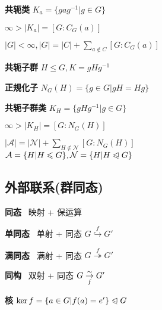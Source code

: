 \documentclass[b4paper, 10pt]{ctexart}
\renewcommand*{\leq}{\leqslant}
\newcommand*{\nmsubgroupeq}{\trianglelefteqslant}
\begin{document}
\begin{multicols}{3}
    \textbf{共轭类} $K_a = \{ gag^{-1} | g \in G \}$

    \begin{theorem}[共轭子群基数定理]
        $\infty > |K_a| = [G:C_G(a)]$
    \end{theorem}

    \begin{theorem}[类方程]
        $|G| \! < \! \infty, |G| \! = \! |C| + \sum\limits_{a \notin C} [G:C_G(a)]$
    \end{theorem}

    \textbf{共轭子群} $H \leq G, K = gHg^{-1}$

    \textbf{正规化子} $N_G(H) = \{g \in G | gH = Hg\}$

    \textbf{共轭子群类} $K_H = \{gHg^{-1} | g \in G\}$

    \begin{theorem}[共轭子群类基数定理]
        $\infty > |K_H| \!\! = \!\! [G:N_G(H)]$
    \end{theorem}

    \begin{theorem}[类方程2]
        $|\mathcal{A}| = |\mathcal{N}| + \sum\limits_{H \notin \mathcal{N}} [G:N_G(H)]$ \\
        $\mathcal{A} = \{ H | H \leq G \}, \mathcal{N} = \{ H | H \nmsubgroupeq G \}$
    \end{theorem}

    \subsection{外部联系(群同态)} \label{sec:group-homomorphism}

    \textbf{同态} \ 映射 + 保运算

    \textbf{单同态} \ 单射 + 同态 $G \overset{f}{\hookrightarrow} G'$

    \textbf{满同态} \ 满射 + 同态 $G \overset{f}{\twoheadrightarrow} G'$

    \textbf{同构} \ 双射 + 同态 $G \overunderset{\sim}{f}{\rightarrow} G'$

    \textbf{核} $\ker f = \{ a \in G | f(a) = e' \} \nmsubgroupeq G$

    \begin{theorem}[同态性质]
        \hfil


\end{theorem}
\end{multicols}
\end{document}
